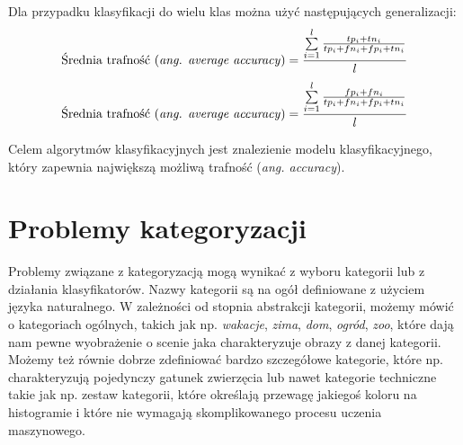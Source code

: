 Dla przypadku klasyfikacji do wielu klas można użyć następujących generalizacji\cite{SOKOLOVA09}:
\begin{equation}
\label{cm_accuracy_multi} 
\text{Średnia trafność (\emph{ang. average accuracy})} = \frac{\sum\limits_{i=1}^l \frac{tp_i + tn_i}{tp_i + fn_i + fp_i + tn_i}}{l}
\end{equation}
\begin{equation}
\label{cm_error_multi} 
\text{Średnia trafność (\emph{ang. average accuracy})} = \frac{\sum\limits_{i=1}^l \frac{fp_i + fn_i}{tp_i + fn_i + fp_i + tn_i}}{l}
\end{equation}

Celem algorytmów klasyfikacyjnych jest znalezienie modelu klasyfikacyjnego, który zapewnia największą możliwą trafność (\emph{ang. accuracy}).

\section{Problemy kategoryzacji}


Problemy związane z kategoryzacją mogą wynikać z wyboru kategorii lub z działania klasyfikatorów. Nazwy kategorii są na ogół definiowane z użyciem języka naturalnego. W zależności od stopnia abstrakcji kategorii, możemy mówić o kategoriach ogólnych, takich jak np. \emph{wakacje}, \emph{zima}, \emph{dom}, \emph{ogród}, \emph{zoo}, które dają nam pewne wyobrażenie o scenie jaka charakteryzuje obrazy z danej kategorii. Możemy też równie dobrze zdefiniować bardzo szczegółowe kategorie, które np. charakteryzują pojedynczy gatunek zwierzęcia lub nawet kategorie techniczne takie jak np. zestaw kategorii, które określają przewagę jakiegoś koloru na histogramie i które nie wymagają skomplikowanego procesu uczenia maszynowego. 

